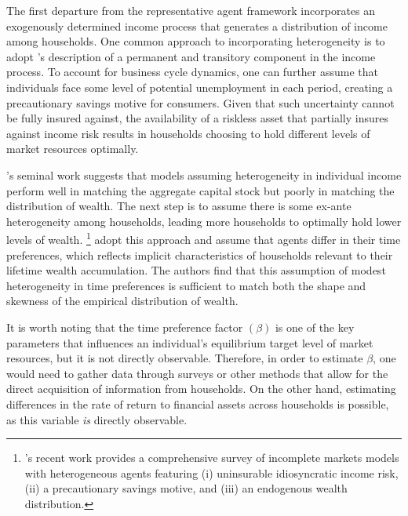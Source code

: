 \par The first departure from the representative agent framework incorporates an exogenously determined income process that generates a distribution of income among households. One common approach to incorporating heterogeneity is to adopt \cite{mf1957}'s description of a permanent and transitory component in the income process. To account for business cycle dynamics, one can further assume that individuals face some level of potential unemployment in each period, creating a precautionary savings motive for consumers. Given that such uncertainty cannot be fully insured against, the availability of a riskless asset that partially insures against income risk results in households choosing to hold different levels of market resources optimally.

\par  \cite{ks1998}'s seminal work suggests that models assuming heterogeneity in individual income perform well in matching the aggregate capital stock but poorly in matching the distribution of wealth. The next step is to assume there is some ex-ante heterogeneity among households, leading more households to optimally hold lower levels of wealth. \footnote{ \cite{gkgv22}'s  recent work provides a comprehensive survey of incomplete markets models with heterogeneous agents featuring (i) uninsurable idiosyncratic income risk, (ii) a precautionary savings motive, and (iii) an endogenous wealth distribution.}  \cite{cstw2017} adopt this approach and assume that agents differ in their time preferences, which reflects implicit characteristics of households relevant to their lifetime wealth accumulation. The authors find that this assumption of modest heterogeneity in time preferences is sufficient to match both the shape and skewness of the empirical distribution of wealth.

\par It is worth noting that the time preference factor $(\beta)$ is one of the key parameters that influences an individual's equilibrium target level of market resources, but it is not directly observable. Therefore, in order to estimate $\beta$, one would need to gather data through surveys or other methods that allow for the direct acquisition of information from households. On the other hand, estimating differences in the rate of return to financial assets across households is possible, as this variable \textit{is} directly observable. 

